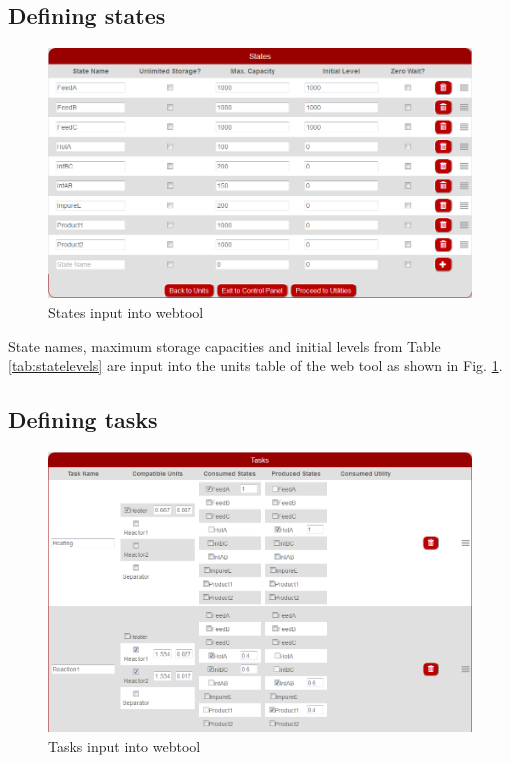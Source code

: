 \subsection{Defining states}
\begin{figure}[htbp]
\centering
\includegraphics[width=\linewidth]{Images/DefineStates.png}
\caption{States input into webtool}
\label{fig:defStates}
\end{figure}
State names, maximum storage capacities and initial levels from Table \ref{tab:statelevels} are input into the units table of the web tool as shown in Fig. \ref{fig:defStates}.


\subsection{Defining tasks}
\begin{figure}[htbp]
\centering
\includegraphics[width=\linewidth]{Images/DefineTasks.png}
\caption{Tasks input into webtool}
\label{fig:defTasks}
\end{figure}

